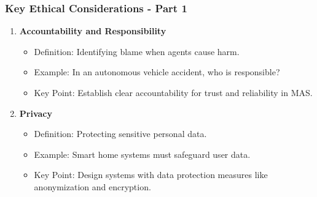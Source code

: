 \documentclass[aspectratio=169]{beamer}
\begin{document}
\begin{frame}[fragile]
    \frametitle{Key Ethical Considerations - Part 1}
    \begin{enumerate}
        \item \textbf{Accountability and Responsibility}
            \begin{itemize}
                \item Definition: Identifying blame when agents cause harm.
                \item Example: In an autonomous vehicle accident, who is responsible?
                \item Key Point: Establish clear accountability for trust and reliability in MAS.
            \end{itemize}
        \item \textbf{Privacy}
            \begin{itemize}
                \item Definition: Protecting sensitive personal data.
                \item Example: Smart home systems must safeguard user data.
                \item Key Point: Design systems with data protection measures like anonymization and encryption.
            \end{itemize}
    \end{enumerate}
\end{frame}
\end{document}
